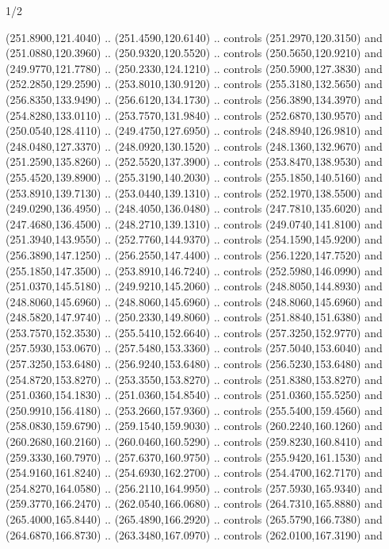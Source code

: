 \begin{flagdescription}{1/2}
\begin{scope}[xshift=0.5\flaglength]
\begin{scope}[scale=0.004\flagwidth,xshift=-90mm,yshift=89mm]
\begin{scope}[y=0.80pt, x=0.80pt, yscale=-1, xscale=1, inner sep=0pt, outer sep=0pt]
\begin{scope}[cm={{-1.0,0.0,0.0,1.0,(639.96566,0.0)}},shift={(0,0)}]
  (251.8900,121.4040) .. (251.4590,120.6140) .. controls (251.2970,120.3150) and
  (251.0880,120.3960) .. (250.9320,120.5520) .. controls (250.5650,120.9210) and
  (249.9770,121.7780) .. (250.2330,124.1210) .. controls (250.5900,127.3830) and
  (252.2850,129.2590) .. (253.8010,130.9120) .. controls (255.3180,132.5650) and
  (256.8350,133.9490) .. (256.6120,134.1730) .. controls (256.3890,134.3970) and
  (254.8280,133.0110) .. (253.7570,131.9840) .. controls (252.6870,130.9570) and
  (250.0540,128.4110) .. (249.4750,127.6950) .. controls (248.8940,126.9810) and
  (248.0480,127.3370) .. (248.0920,130.1520) .. controls (248.1360,132.9670) and
  (251.2590,135.8260) .. (252.5520,137.3900) .. controls (253.8470,138.9530) and
  (255.4520,139.8900) .. (255.3190,140.2030) .. controls (255.1850,140.5160) and
  (253.8910,139.7130) .. (253.0440,139.1310) .. controls (252.1970,138.5500) and
  (249.0290,136.4950) .. (248.4050,136.0480) .. controls (247.7810,135.6020) and
  (247.4680,136.4500) .. (248.2710,139.1310) .. controls (249.0740,141.8100) and
  (251.3940,143.9550) .. (252.7760,144.9370) .. controls (254.1590,145.9200) and
  (256.3890,147.1250) .. (256.2550,147.4400) .. controls (256.1220,147.7520) and
  (255.1850,147.3500) .. (253.8910,146.7240) .. controls (252.5980,146.0990) and
  (251.0370,145.5180) .. (249.9210,145.2060) .. controls (248.8050,144.8930) and
  (248.8060,145.6960) .. (248.8060,145.6960) .. controls (248.8060,145.6960) and
  (248.5820,147.9740) .. (250.2330,149.8060) .. controls (251.8840,151.6380) and
  (253.7570,152.3530) .. (255.5410,152.6640) .. controls (257.3250,152.9770) and
  (257.5930,153.0670) .. (257.5480,153.3360) .. controls (257.5040,153.6040) and
  (257.3250,153.6480) .. (256.9240,153.6480) .. controls (256.5230,153.6480) and
  (254.8720,153.8270) .. (253.3550,153.8270) .. controls (251.8380,153.8270) and
  (251.0360,154.1830) .. (251.0360,154.8540) .. controls (251.0360,155.5250) and
  (250.9910,156.4180) .. (253.2660,157.9360) .. controls (255.5400,159.4560) and
  (258.0830,159.6790) .. (259.1540,159.9030) .. controls (260.2240,160.1260) and
  (260.2680,160.2160) .. (260.0460,160.5290) .. controls (259.8230,160.8410) and
  (259.3330,160.7970) .. (257.6370,160.9750) .. controls (255.9420,161.1530) and
  (254.9160,161.8240) .. (254.6930,162.2700) .. controls (254.4700,162.7170) and
  (254.8270,164.0580) .. (256.2110,164.9950) .. controls (257.5930,165.9340) and
  (259.3770,166.2470) .. (262.0540,166.0680) .. controls (264.7310,165.8880) and
  (265.4000,165.8440) .. (265.4890,166.2920) .. controls (265.5790,166.7380) and
  (264.6870,166.8730) .. (263.3480,167.0970) .. controls (262.0100,167.3190) and

\end{scope}
\end{scope}
\end{scope}
\end{scope}
\end{flagdescription}
